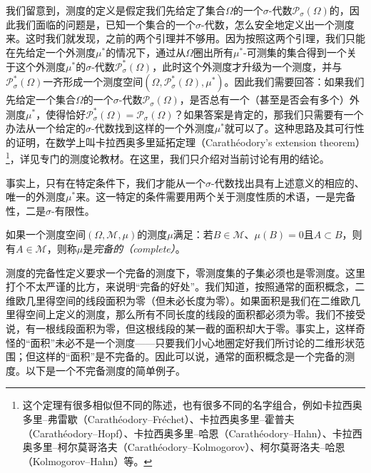 \documentclass[main.tex]{subfiles}
\begin{document}
我们留意到，测度的定义是假定我们先给定了集合$\Omega$的一个$\sigma$-代数$\mathcal{P}_\sigma\left(\Omega\right)$的，因此我们面临的问题是，已知一个集合的一个$\sigma$-代数，怎么安全地定义出一个测度来。这时我们就发现，之前的两个引理并不够用。因为按照这两个引理，我们只能在先给定一个外测度$\mu^*$的情况下，通过从$\Omega$圈出所有$\mu^*$-可测集的集合得到一个关于这个外测度$\mu^*$的$\sigma$-代数$\mathcal{P}^*_\sigma\left(\Omega\right)$，此时这个外测度才升级为一个测度，并与$\mathcal{P}^*_\sigma\left(\Omega\right)$一齐形成一个测度空间$\left(\Omega,\mathcal{P}^*_\sigma\left(\Omega\right),\mu^*\right)$。因此我们需要回答：如果我们先给定一个集合$\Omega$的一个$\sigma$-代数$\mathcal{P}_\sigma\left(\Omega\right)$，是否总有一个（甚至是否会有多个）外测度$\mu^*$，使得恰好$\mathcal{P}^*_\sigma\left(\Omega\right)=\mathcal{P}_\sigma\left(\Omega\right)$？如果答案是肯定的，那我们只需要有一个办法从一个给定的$\sigma$-代数找到这样的一个外测度$\mu^*$就可以了。这种思路及其可行性的证明，在数学上叫卡拉西奥多里延拓定理（Carathéodory's extension theorem）\footnote{这个定理有很多相似但不同的陈述，也有很多不同的名字组合，例如卡拉西奥多里--弗雷歇（Carathéodory--Fréchet）、卡拉西奥多里--霍普夫（Carathéodory--Hopf）、卡拉西奥多里--哈恩（Carathéodory--Hahn）、卡拉西奥多里--柯尔莫哥洛夫（Carathéodory--Kolmogorov）、柯尔莫哥洛夫--哈恩（Kolmogorov--Hahn）等。}，详见专门的测度论教材。在这里，我们只介绍对当前讨论有用的结论。

事实上，只有在特定条件下，我们才能从一个$\sigma$-代数找出具有上述意义的相应的、唯一的外测度$\mu^*$来。这一特定的条件需要用两个关于测度性质的术语，一是完备性，二是$\sigma$-有限性。

\begin{definition}[测度的完备性]
    如果一个测度空间$\left(\Omega,\mathcal{M},\mu\right)$的测度$\mu$满足：若$B\in\mathcal{M}$、$\mu\left(B\right)=0$且$A\subset B$，则有$A\in\mathcal{M}$，则称$\mu$是\emph{完备的（complete）}。
\end{definition}

测度的完备性定义要求一个完备的测度下，零测度集的子集必须也是零测度。这里打个不太严谨的比方，来说明“完备的好处”。我们知道，按照通常的面积概念，二维欧几里得空间的线段面积为零（但未必长度为零）。如果面积是我们在二维欧几里得空间上定义的测度，那么所有不同长度的线段的面积都必须为零。我们不接受说，有一根线段面积为零，但这根线段的某一截的面积却大于零。事实上，这样奇怪的“面积”未必不是一个测度——只要我们小心地圈定好我们所讨论的二维形状范围；但这样的“面积”是不完备的。因此可以说，通常的面积概念是一个完备的测度。以下是一个不完备测度的简单例子。
\end{document}

